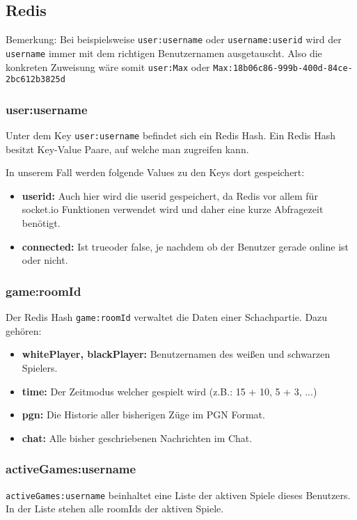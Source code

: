 \subsection{Redis}
\label{sec:redis-data}

Bemerkung: Bei beispielsweise \verb|user:username| oder \verb|username:userid| wird der \verb|username| immer mit dem richtigen Benutzernamen ausgetauscht. Also die konkreten Zuweisung wäre somit \verb|user:Max| oder \verb|Max:18b06c86-999b-400d-84ce-2bc612b3825d|
\subsubsection{user:username}
Unter dem Key \verb|user:username| befindet sich ein Redis Hash. Ein Redis Hash besitzt Key-Value Paare, auf welche man zugreifen kann.

In unserem Fall werden folgende Values zu den Keys dort gespeichert:
\begin{itemize}
\item \textbf{userid:} Auch hier wird die userid gespeichert, da Redis vor allem für socket.io Funktionen verwendet wird und daher eine kurze Abfragezeit benötigt.
\item \textbf{connected:} Ist \glqq true\grqq{ }oder \glqq false\grqq , je nachdem ob der Benutzer gerade online ist oder nicht.
\end{itemize}

\subsubsection{game:roomId}
\label{sec:game:roomId}
Der Redis Hash \verb|game:roomId| verwaltet die Daten einer Schachpartie. Dazu gehören:
\begin{itemize}
\item \textbf{whitePlayer, blackPlayer:} Benutzernamen des weißen und schwarzen Spielers.
\item \textbf{time:} Der Zeitmodus welcher gespielt wird (z.B.: 15 + 10, 5 + 3, ...)
\item \textbf{pgn:} Die Historie aller bisherigen Züge im PGN Format.
\item \textbf{chat:} Alle bisher geschriebenen Nachrichten im Chat.
\end{itemize}

\subsubsection{activeGames:username}
\label{activeGames:username}
\verb|activeGames:username| beinhaltet eine Liste der aktiven Spiele dieses Benutzers. In der Liste stehen alle roomIds der aktiven Spiele.

